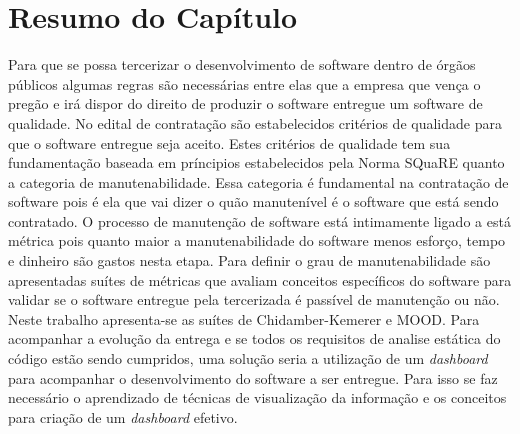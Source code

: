 \section{Resumo do Capítulo}
Para que se possa tercerizar o desenvolvimento de software dentro de órgãos públicos algumas regras são necessárias entre elas que a empresa que vença o pregão e irá dispor do direito de produzir o software entregue um software de qualidade. No edital de contratação são estabelecidos critérios de qualidade para que o software entregue seja aceito. Estes critérios de qualidade tem sua fundamentação baseada em príncipios estabelecidos pela Norma SQuaRE quanto a categoria de manutenabilidade. Essa categoria é fundamental na contratação de software pois é ela que vai dizer o quão manutenível é o software que está sendo contratado. O processo de manutenção de software está intimamente ligado a está métrica pois quanto maior a manutenabilidade do software menos esforço, tempo e dinheiro são gastos nesta etapa. Para definir o grau de manutenabilidade são apresentadas suítes de métricas que avaliam conceitos específicos do software para validar se o software entregue pela tercerizada é passível de manutenção ou não. Neste trabalho apresenta-se as suítes de Chidamber-Kemerer e MOOD. Para acompanhar a evolução da entrega e se todos os requisitos de analise estática do código estão sendo cumpridos, uma solução seria a utilização de um \textit{dashboard} para acompanhar o desenvolvimento do software a ser entregue. Para isso se faz necessário o aprendizado de técnicas de visualização da informação e os conceitos para criação de um \textit{dashboard} efetivo.